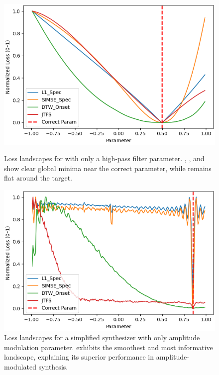 \begin{figure}[ht]
    \centering
    \begin{minipage}[t]{0.48\textwidth}
        \centering
        \includegraphics[width=\linewidth]{images/experiment_plots/comparing_loss_landscapes_normalized.png}
        \caption{Loss landscapes for \BPNoise{} with only a high-pass filter parameter. 
        \LoneSpec{}, \SIMSESpec{}, and \JTFS{} show clear global minima near the correct parameter, while \DTWEnv{} remains flat around the target.}
        \label{fig:loss_landscape_noisebp}
    \end{minipage}%
    \hfill
    \begin{minipage}[t]{0.48\textwidth}
        \centering
        \includegraphics[width=\linewidth]{images/experiment_plots/comparing_lanscapes_1_1d_normalized.png}
        \caption{Loss landscapes for a simplified \AmpMod{} synthesizer with only amplitude modulation parameter. 
        \DTWEnv{} exhibits the smoothest and most informative landscape, explaining its superior performance in amplitude-modulated synthesis.}
        \label{fig:loss_landscape_ampmod}
    \end{minipage}
\end{figure}


